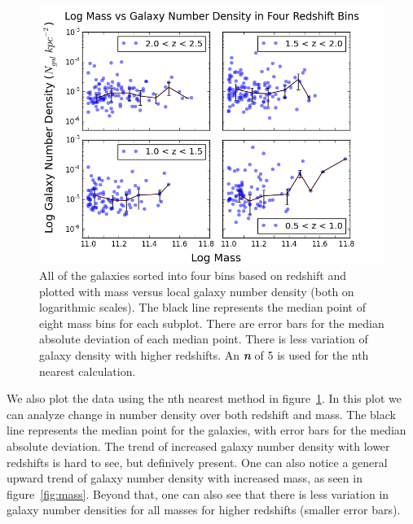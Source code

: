 \documentclass[apj]{emulateapj}
\begin{document}
\begin{figure}
\centering
\graphicspath{{C:/3d_hst/2015_finals/nth_nearest/}}
\includegraphics[width=\linewidth]{Mass_Density_Z}
\caption{\footnotesize All of the galaxies sorted into four bins based on redshift and plotted with mass versus local galaxy number density (both on logarithmic scales). The black line represents the median point of eight mass bins for each subplot. There are error bars for the median absolute deviation of each median point. There is less variation of galaxy density with higher redshifts. An \textbf{\textit{n}} of 5 is used for the nth nearest calculation.}
\label{fig:nth}
\end{figure}

We also plot the data using the nth nearest method in figure~\ref{fig:nth}. In this plot we can analyze change in number density over both redshift and mass. The black line represents the median point for the galaxies, with error bars for the median absolute deviation. The trend of increased galaxy number density with lower redshifts is hard to see, but definively present. One can also notice a general upward trend of galaxy number density with increased mass, as seen in figure~\ref{fig:mass}. Beyond that, one can also see that there is less variation in galaxy number densities for all masses for higher redshifts (smaller error bars).
\end{document}
